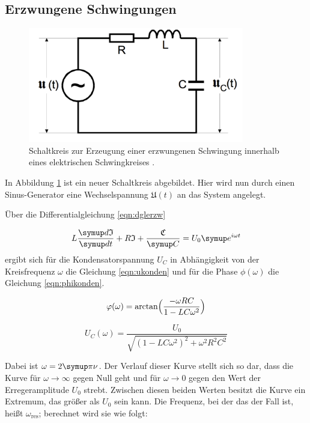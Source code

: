 \subsection{Erzwungene Schwingungen}

\begin{figure}[h]
  \centering
  \includegraphics[height = 5cm]{erzwschw.pdf}
  \caption{Schaltkreis zur Erzeugung einer erzwungenen Schwingung innerhalb
  eines elektrischen Schwingkreises \cite{anleitung}.}
  \label{fig:erzwschw}
\end{figure}

In Abbildung \ref{fig:erzwschw} ist ein neuer Schaltkreis abgebildet. Hier
wird nun durch einen Sinus-Generator eine Wechselspannung  $\mathfrak{U}(t)$
an das System angelegt.

Über die Differentialgleichung \eqref{eqn:dglerzw}

\begin{equation}
  L\frac{\g{d}\mathfrak{I}}{\g{dt}} + R\mathfrak{I} + \frac{\mathfrak{C}}{\g{C}}
   = U_{\text{0}}\g{e}^{i\omega t}
  \label{eqn:dglerzw}
\end{equation}
ergibt sich für die Kondensatorspannung $U_C$ in Abhängigkeit von der
Kreisfrequenz $\omega$ die Gleichung \eqref{eqn:ukonden} und für die Phase
$\phi(\omega)$ die Gleichung \eqref{eqn:phikonden}.

\begin{equation}
  \varphi(\omega) = \arctan \Bigl(\frac{-\omega R C}{1-LC \omega^2}\Bigr)
  \label{eqn:phikonden}
\end{equation}

\begin{equation}
  U_C(\omega) = \frac{U_\text{0}}{\sqrt{(1 - LC\omega^2)^2 + \omega^2
  R^2C^2}}
  \label{eqn:ukonden}
\end{equation}

Dabei ist $\omega = 2 \g{\pi} \nu$. Der Verlauf dieser Kurve stellt sich
so dar, dass die Kurve für $\omega \to \infty$ gegen Null geht und für
$\omega \to 0$ gegen den Wert der Erregeramplitude $U_0$ strebt.
Zwischen diesen beiden Werten besitzt die Kurve ein Extremum, das
größer als $U_0$ sein kann. Die Frequenz, bei der das der Fall ist,
heißt $\omega_{\text{res}}$; berechnet wird sie wie folgt:

